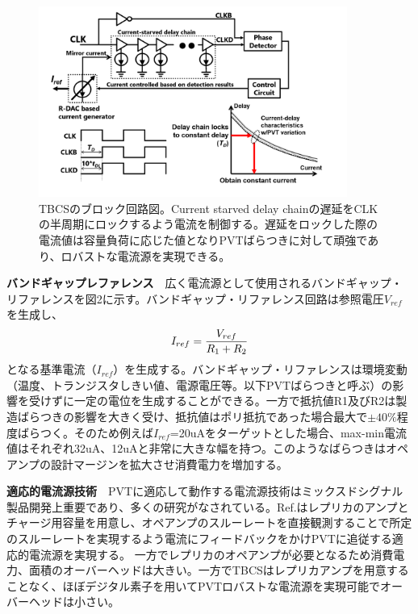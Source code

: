 \documentclass[letterpaper, 10 pt, conference]{ieeeconf}  %
\begin{document}
\begin{figure}[!]
\centering
 \includegraphics[width=0.9\textwidth]{figs/fig2.png}
  \caption{TBCSのブロック回路図。Current starved delay chainの遅延をCLKの半周期にロックするよう電流を制御する。遅延をロックした際の電流値は容量負荷に応じた値となりPVTばらつきに対して頑強であり、ロバストな電流源を実現できる。}
  \label{fig2}
\end{figure}

\textbf{バンドギャップレファレンス}　広く電流源として使用されるバンドギャップ・リファレンスを図2に示す。バンドギャップ・リファレンス回路は参照電圧$V_{ref}$を生成し、
\begin{eqnarray}
    \centering
    I_{ref} = \frac{V_{ref}}{R_1 + R_2}
    \label{sar13b}
\end{eqnarray}
となる基準電流（$I_{ref}$）を生成する。バンドギャップ・リファレンスは環境変動（温度、トランジスタしきい値、電源電圧等。以下PVTばらつきと呼ぶ）の影響を受けずに一定の電位を生成することができる。一方で抵抗値R1及びR2は製造ばらつきの影響を大きく受け、抵抗値はポリ抵抗であった場合最大で$\pm 40\%$程度ばらつく。そのため例えば$I_{ref}$=20uAをターゲットとした場合、max-min電流値はそれぞれ32uA、12uAと非常に大きな幅を持つ。このようなばらつきはオペアンプの設計マージンを拡大させ消費電力を増加する。

\textbf{適応的電流源技術}　PVTに適応して動作する電流源技術はミックスドシグナル製品開発上重要であり、多くの研究がなされている。Ref.\cite{chuanyang,ron}はレプリカのアンプとチャージ用容量を用意し、オペアンプのスルーレートを直接観測することで所定のスルーレートを実現するよう電流にフィードバックをかけPVTに追従する適応的電流源を実現する。
一方でレプリカのオペアンプが必要となるため消費電力、面積のオーバーヘッドは大きい。一方でTBCSはレプリカアンプを用意することなく、ほぼデジタル素子を用いてPVTロバストな電流源を実現可能でオーバーヘッドは小さい。
\end{document}
